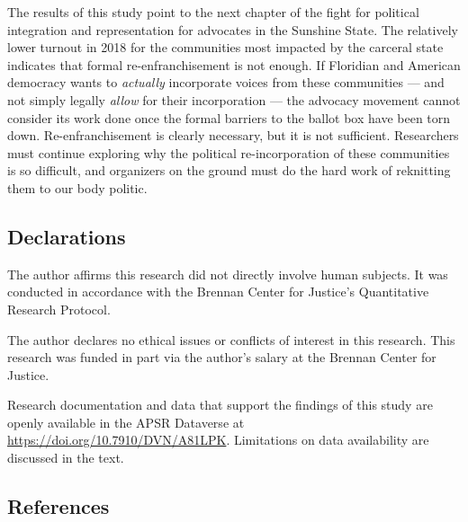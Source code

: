 \documentclass[
  12pt,
]{article}
\begin{document}
The results of this study point to the next chapter of the fight for political integration and representation for advocates in the Sunshine State. The relatively lower turnout in 2018 for the communities most impacted by the carceral state indicates that formal re-enfranchisement is not enough. If Floridian and American democracy wants to \emph{actually} incorporate voices from these communities --- and not simply legally \emph{allow} for their incorporation --- the advocacy movement cannot consider its work done once the formal barriers to the ballot box have been torn down. Re-enfranchisement is clearly necessary, but it is not sufficient. Researchers must continue exploring why the political re-incorporation of these communities is so difficult, and organizers on the ground must do the hard work of reknitting them to our body politic.

\newpage

\hypertarget{declarations}{%
\subsection*{Declarations}\label{declarations}}

The author affirms this research did not directly involve human subjects. It was conducted in accordance with the Brennan Center for Justice's Quantitative Research Protocol.

The author declares no ethical issues or conflicts of interest in this research. This research was funded in part via the author's salary at the Brennan Center for Justice.

Research documentation and data that support the findings of this study are openly available in the APSR Dataverse at \url{https://doi.org/10.7910/DVN/A81LPK}. Limitations on data availability are discussed in the text.

\newpage

\hypertarget{references}{%
\subsection*{References}\label{references}}
\end{document}
